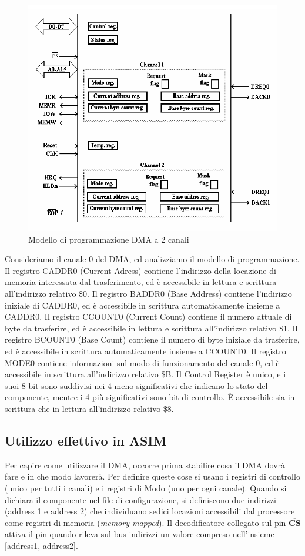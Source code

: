 \begin{figure}[ht]
    \centering
    \includegraphics[width=.7\textwidth]{img/DMA.png}
    \caption{Modello di programmazione DMA a 2 canali}
    \label{img:DMA}
\end{figure}

Consideriamo il canale 0 del DMA, ed analizziamo il modello di programmazione.
Il registro CADDR0 (Current Adress) contiene l'indirizzo della locazione di memoria interessata dal trasferimento, ed è accessibile in lettura e scrittura all'indirizzo relativo \$0. Il registro BADDR0 (Base Address) contiene l'indirizzo iniziale di CADDR0, ed è accessibile in scrittura automaticamente insieme a CADDR0. 
Il registro CCOUNT0 (Current Count) contiene il numero attuale di byte da trasferire, ed è accessibile in lettura e scrittura all'indirizzo relativo \$1. Il registro BCOUNT0 (Base Count) contiene il numero di byte iniziale da trasferire, ed è accessibile in scrittura automaticamente insieme a CCOUNT0. Il registro MODE0 contiene informazioni sul modo di funzionamento del canale 0, ed è accessibile in scrittura all'indirizzo relativo \$B. Il Control Register è unico, e i suoi 8 bit sono suddivisi nei 4 meno significativi che indicano lo stato del componente, mentre i 4 più significativi sono bit di controllo. \uppercase{è} accessibile sia in scrittura che in lettura all'indirizzo relativo \$8.


\subsection{Utilizzo effettivo in ASIM}

Per capire come utilizzare il DMA, occorre prima stabilire cosa il DMA dovrà fare e in che modo lavorerà. Per definire queste cose si usano i registri di controllo (unico per tutti i canali) e i registri di Modo (uno per ogni canale). Quando si dichiara il componente nel file di configurazione, si definiscono due indirizzi (address 1 e address 2) che individuano sedici locazioni accessibili dal processore come registri di memoria (\textit{memory mapped}). Il decodificatore collegato sul pin $\overline{\mathbf{CS}}$ attiva il pin quando rileva sul bus indirizzi un valore compreso nell'insieme [address1, address2].

